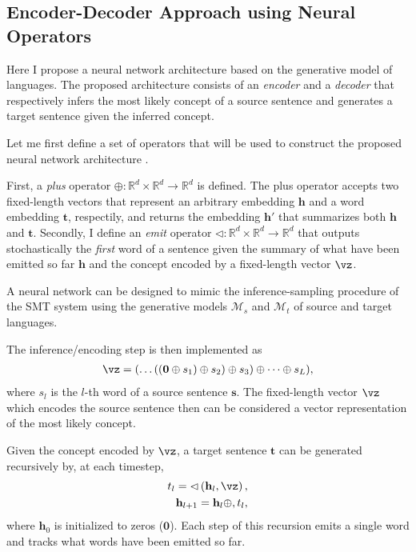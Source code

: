 \documentclass[11pt, oneside]{essay}
\newcommand{\vect}[1]{\mathbf{#1}}
\newcommand{\vh}[0]{\vect{h}}
\newcommand{\vs}[0]{\vect{s}}
\newcommand{\vt}[0]{\vect{t}}
\newcommand{\vzero}[0]{\vect{0}}
\newcommand{\RR}[0]{\mathbb{R}}
\begin{document}
\subsection{Encoder-Decoder Approach using Neural Operators}

Here I propose a neural network architecture based on the
generative model of languages. The proposed architecture consists
of an \textit{encoder} and a \textit{decoder} that respectively
infers the most likely concept of a source sentence and generates
a target sentence given the inferred concept.

Let me first define a set of operators that will be used to
construct the proposed neural network architecture
\citep[see, e.g.,][]{Pascanu2013}. 

First, a \textit{plus} operator $\oplus: \RR^d \times \RR^d \to
\RR^d$ is defined. The plus operator accepts two fixed-length
vectors that represent an arbitrary embedding $\vh$ and a word
embedding $\vt$, respectily, and returns the embedding $\vh'$
that summarizes both $\vh$ and $\vt$. Secondly, I define an
\textit{emit} operator $\lhd: \RR^d \times \RR^d \to \RR^d$ that
outputs stochastically the \textit{first} word of a sentence
given the summary of what have been emitted so far $\vh$ and the
concept encoded by a fixed-length vector $\vz$.

A neural network can be designed to mimic the inference-sampling
procedure of the SMT system using the generative models
$\mathcal{M}_s$ and $\mathcal{M}_t$ of source and target
languages. 

The inference/encoding step is then implemented as
\begin{align}
\label{eq:encoder}
\vz = (\dots ((\vzero \oplus s_1) \oplus s_2) \oplus s_3) \oplus \dots
\oplus s_L),
\end{align}
where $s_l$ is the $l$-th word of a source sentence $\vs$. The
fixed-length vector $\vz$ which encodes the source sentence then
can be considered a vector representation of the most likely
concept.

Given the concept encoded by $\vz$, a target sentence $\vt$ can
be generated recursively by, at each timestep,
\begin{align}
\label{eq:decoder}
t_l = \lhd \left(\vh_l, \vz\right), \\
\vh_{l+1} = \vh_l \oplus, t_l,
\end{align}
where $\vh_0$ is initialized to zeros ($\vzero$). Each step of
this recursion emits a single word and tracks what words have
been emitted so far.
\end{document}
